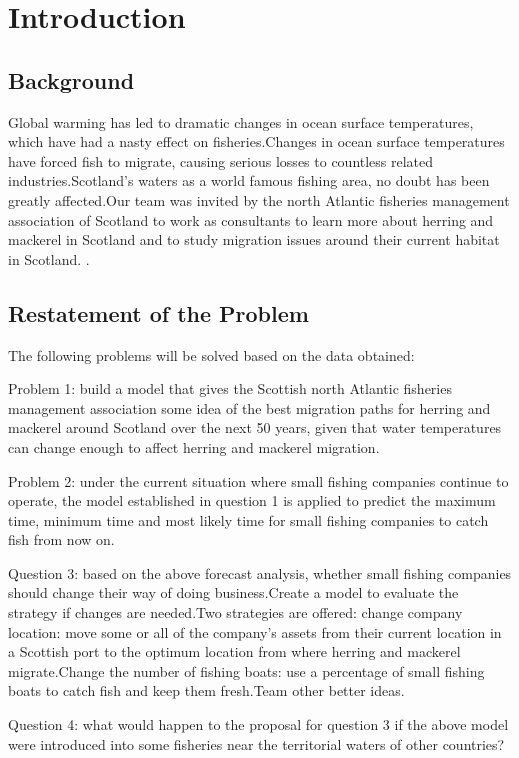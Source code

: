 \documentclass{mcmthesis}
\begin{document}
\newpage
\setcounter{page}{1}
\section{Introduction}
\subsection{Background}
Global warming has led to dramatic changes in ocean surface temperatures, which have had a nasty effect on fisheries.Changes in ocean surface temperatures have forced fish to migrate, causing serious losses to countless related industries.Scotland's waters as a world famous fishing area, no doubt has been greatly affected.Our team was invited by the north Atlantic fisheries management association of Scotland to work as consultants to learn more about herring and mackerel in Scotland and to study migration issues around their current habitat in Scotland.
.
\subsection{Restatement of the Problem}%
The following problems will be solved based on the data obtained:

Problem 1: build a model that gives the Scottish north Atlantic fisheries management association some idea of the best migration paths for herring and mackerel around Scotland over the next 50 years, given that water temperatures can change enough to affect herring and mackerel migration.

Problem 2: under the current situation where small fishing companies continue to operate, the model established in question 1 is applied to predict the maximum time, minimum time and most likely time for small fishing companies to catch fish from now on.

Question 3: based on the above forecast analysis, whether small fishing companies should change their way of doing business.Create a model to evaluate the strategy if changes are needed.Two strategies are offered: change company location: move some or all of the company's assets from their current location in a Scottish port to the optimum location from where herring and mackerel migrate.Change the number of fishing boats: use a percentage of small fishing boats to catch fish and keep them fresh.Team other better ideas.

Question 4: what would happen to the proposal for question 3 if the above model were introduced into some fisheries near the territorial waters of other countries?
\end{document}
